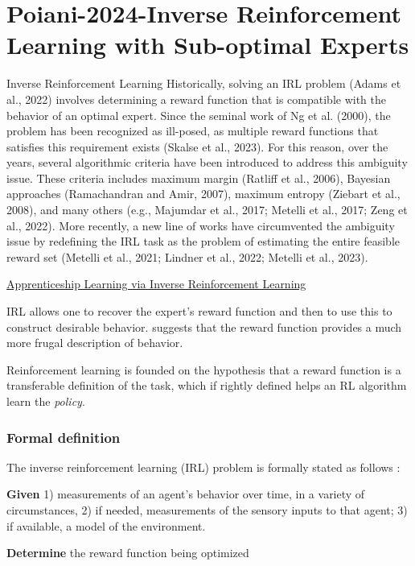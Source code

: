 \documentclass{article}
\begin{document}
	
	
	\section{Poiani-2024-Inverse Reinforcement Learning with Sub-optimal Experts}
	
	Inverse Reinforcement Learning Historically,
	solving an IRL problem (Adams et al., 2022) involves
	determining a reward function that is compatible with
	the behavior of an optimal expert. Since the seminal
	work of Ng et al. (2000), the problem has been recognized
	as ill-posed, as multiple reward functions that
	satisfies this requirement exists (Skalse et al., 2023).
	For this reason, over the years, several algorithmic
	criteria have been introduced to address this ambiguity
	issue. These criteria includes maximum margin
	(Ratliff et al., 2006), Bayesian approaches (Ramachandran
	and Amir, 2007), maximum entropy (Ziebart
	et al., 2008), and many others (e.g., Majumdar et al.,
	2017; Metelli et al., 2017; Zeng et al., 2022). More
	recently, a new line of works have circumvented the
	ambiguity issue by redefining the IRL task as the problem
	of estimating the entire feasible reward set (Metelli
	et al., 2021; Lindner et al., 2022; Metelli et al., 2023).
	
	\href{https://ai.stanford.edu/~ang/papers/icml04-apprentice.pdf}{Apprenticeship Learning via Inverse Reinforcement Learning}
	
	IRL allows one to recover the expert's reward function and then to use this to construct desirable behavior. \citet{ng2000algorithms} suggests that the reward function provides a much more frugal description of behavior. 
	
	Reinforcement learning is founded on the hypothesis that a reward function is a transferable definition of the task, which if rightly defined helps an RL algorithm learn the \textit{policy}. 
	
	\subsubsection{Formal definition}
	The inverse reinforcement learning (IRL) problem is formally stated as follows \citep{ng2000algorithms}:
	
	\textbf{Given} 1) measurements of an agent's behavior over time, in a variety of circumstances, 2) if needed, measurements of the sensory inputs to that agent; 3) if available, a model of the environment.
	
	\textbf{Determine} the reward function being optimized
	
\end{document}
